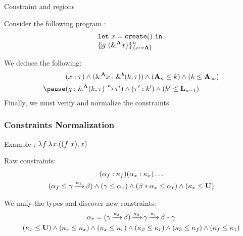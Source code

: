 \documentclass[aspectratio=169,dvipsnames,svgnames,10pt]{beamer}
\begin{document}
\begin{frame}{Constraint and regions}

  Consider the following program : 
\[
  \setlength{\jot}{-1pt}
  \begin{aligned}
  &\letin{x}{\texttt{create} ()}{}\\
  &\region[n]{\Sone x\MBORROW}{g\ (\borrow[\kaff]{x})}\\
\end{aligned}
\]\pause

We deduce the following:
\begin{align*}
  &(x : \tau) \wedge (\borrow[\kaff]{x} : \borrowty{k}{\tau}) \wedge
  (\kaff_{n} \leq k) \wedge (k \leq \kaff_{\infty})\\\pause
  &(g : \borrowty[\kaff]{k}{\tau}\tarr{\kvar}\tau') \wedge (\tau' : k') \wedge
  (k' \leq \klin_{n-1})
\end{align*}
\pause
Finally, we must verify and normalize the constraints

\end{frame}

\begin{frame}
  \frametitle{Constraints \hfill Normalization}

  Example : $\lambda^{{}} f.{\lambda^{{}} x.{((f\ x),x)}}$

  Raw constraints:
  \begin{gather*}
    (\alpha_f : \kappa_f)
    (\alpha_x : \kappa_x)\dots\\
    (\alpha_f \leq \gamma \operatorname{\xrightarrow{\kappa_1}} \beta )
    \wedge
    (\gamma \leq \alpha_x)
    \wedge
    (\beta * \alpha_x \leq \alpha_r)
    \wedge
    (\kappa_x \leq \mathbf{U})
  \end{gather*}\pause

  We unify the types and discover new constraints:
  \begin{gather*}
    \alpha_r =
    (\gamma \operatorname{\xrightarrow{\kappa_3}} \beta) \operatorname{\xrightarrow{\kappa_2}} \gamma \operatorname{\xrightarrow{\kappa_1}} \beta * \gamma\\
    (\kappa_x \leq \mathbf{U})
    \wedge
    (\kappa_\gamma \leq \kappa_x)
    \wedge
    (\kappa_x \leq \kappa_r)
    \wedge
    (\kappa_\beta \leq \kappa_r)
    \wedge
    (\kappa_3 \leq \kappa_f)
    \wedge
    (\kappa_f \leq \kappa_1)
  \end{gather*}
\end{frame}
\end{document}
